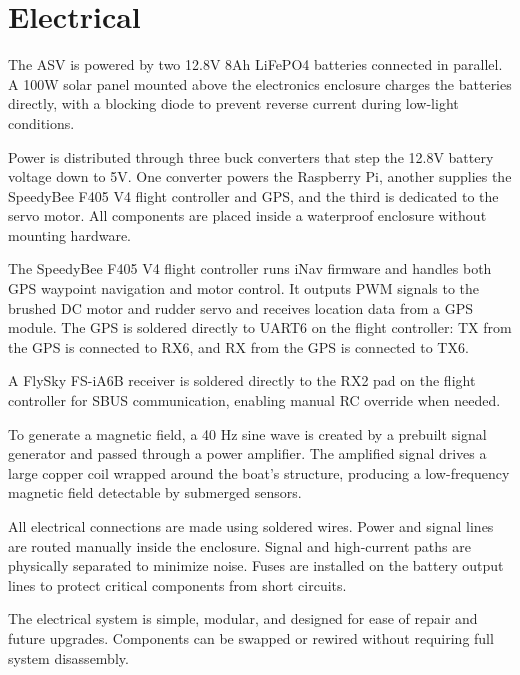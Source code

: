 \section{Electrical}

The ASV is powered by two 12.8V 8Ah LiFePO4 batteries connected in parallel. A 100W solar panel mounted above the electronics enclosure charges the batteries directly, with a blocking diode to prevent reverse current during low-light conditions.

Power is distributed through three buck converters that step the 12.8V battery voltage down to 5V. One converter powers the Raspberry Pi, another supplies the SpeedyBee F405 V4 flight controller and GPS, and the third is dedicated to the servo motor. All components are placed inside a waterproof enclosure without mounting hardware.

The SpeedyBee F405 V4 flight controller runs iNav firmware and handles both GPS waypoint navigation and motor control. It outputs PWM signals to the brushed DC motor and rudder servo and receives location data from a GPS module. The GPS is soldered directly to UART6 on the flight controller: TX from the GPS is connected to RX6, and RX from the GPS is connected to TX6.

A FlySky FS-iA6B receiver is soldered directly to the RX2 pad on the flight controller for SBUS communication, enabling manual RC override when needed.

To generate a magnetic field, a 40 Hz sine wave is created by a prebuilt signal generator and passed through a power amplifier. The amplified signal drives a large copper coil wrapped around the boat’s structure, producing a low-frequency magnetic field detectable by submerged sensors.

All electrical connections are made using soldered wires. Power and signal lines are routed manually inside the enclosure. Signal and high-current paths are physically separated to minimize noise. Fuses are installed on the battery output lines to protect critical components from short circuits.

The electrical system is simple, modular, and designed for ease of repair and future upgrades. Components can be swapped or rewired without requiring full system disassembly.
